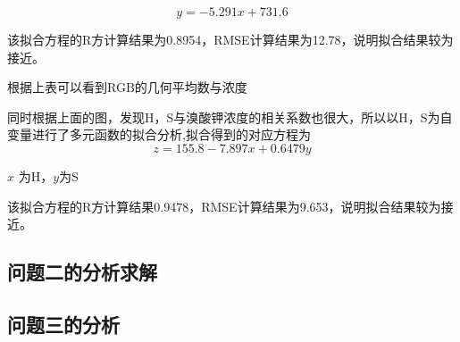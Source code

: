     $$y = -5.291 x + 731.6$$

    该拟合方程的R方计算结果为0.8954，RMSE计算结果为12.78，说明拟合结果较为接近。

    根据上表可以看到RGB的几何平均数与浓度


    同时根据上面的图，发现H，S与溴酸钾浓度的相关系数也很大，所以以H，S为自变量进行了多元函数的拟合分析,拟合得到的对应方程为
    $$ z = 155.8 -7.897 x + 0.6479y $$
    
    $x$ 为H，$y $为S

    该拟合方程的R方计算结果0.9478，RMSE计算结果为9.653，说明拟合结果较为接近。

\subsection{问题二的分析求解}

\subsection{问题三的分析}
